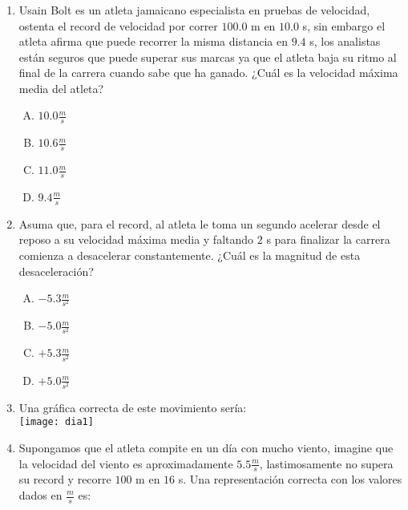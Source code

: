 \subsubsection*{}

\begin{enumerate}
\item Usain Bolt es un atleta jamaicano especialista en pruebas de velocidad, ostenta el record de velocidad por correr $100.0$ m en $10.0$ s, sin embargo el atleta afirma que puede recorrer la misma distancia en $9.4$ s, los analistas están seguros que puede superar sus marcas ya que el atleta baja su ritmo al final de la carrera cuando sabe que ha ganado. ¿Cuál es la velocidad máxima media del atleta? \label{dia-1}

\begin{enumerate}[(A)]
\item $10.0\frac{m}{s}$
\item $10.6\frac{m}{s}$
\item $11.0\frac{m}{s}$
\item $9.4\frac{m}{s}$
\end{enumerate}

\item Asuma que, para el record, al atleta le toma un segundo acelerar desde el reposo a su velocidad máxima media y faltando $2$ s para finalizar la carrera comienza a desacelerar constantemente. ¿Cuál es la magnitud de esta desaceleración?\label{dia-2}

\begin{enumerate}[(A)]
\item $-5.3 \frac{m}{s^2}$
\item $-5.0 \frac{m}{s^2}$
\item $+5.3 \frac{m}{s^2}$
\item $+5.0 \frac{m}{s^2}$
\end{enumerate}

\newpage
\item Una gráfica correcta de este movimiento sería: \label{dia-3}\\

\texttt{[image: dia1]}



\item Supongamos que el atleta compite en un día con mucho viento, imagine que la velocidad del viento es aproximadamente $5.5\frac{m}{s}$, lastimosamente no supera su record y recorre $100$ m en $16$ s. \label{dia-4}
\noindent Una representación correcta con los valores dados en $\frac{m}{s}$ es:


\end{enumerate}

